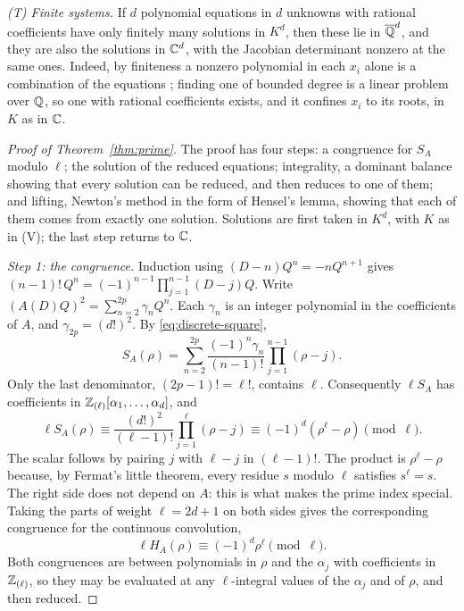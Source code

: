 \emph{\textup{(T)} Finite systems.} If \(d\) polynomial equations in
\(d\) unknowns with rational coefficients have only finitely many
solutions in \(K^d\), then these lie in \(\overline{\mathbb Q}^d\), and they are
also the solutions in \(\mathbb C^d\), with the Jacobian determinant nonzero
at the same ones. Indeed, by finiteness a nonzero polynomial in each
\(x_i\) alone is a combination of the equations
\citep[Chapter~5, \S3]{CoxLittleOSheaIVA}; finding one of bounded degree
is a linear problem over \(\mathbb Q\), so one with rational coefficients
exists, and it confines \(x_i\) to its roots, in \(K\) as in \(\mathbb C\).

\begin{proof}[Proof of Theorem~\ref{thm:prime}]
The proof has four steps: a congruence for \(S_A\) modulo \(\ell\); the
solution of the reduced equations; integrality, a dominant balance
showing that every solution can be reduced, and then reduces to one of
them; and lifting, Newton's method in the form of Hensel's lemma,
showing that each of them comes from exactly one solution. Solutions are
first taken in \(K^d\), with \(K\) as in \textup{(V)}; the last step
returns to \(\mathbb C\).

\emph{Step 1: the congruence.} Induction using \((D-n)Q^n=-nQ^{n+1}\)
gives \((n-1)!\,Q^n=(-1)^{n-1}\prod_{j=1}^{n-1}(D-j)Q\). Write
\((A(D)Q)^2=\sum_{n=2}^{2p}\gamma_nQ^n\). Each \(\gamma_n\) is an
integer polynomial in the coefficients of \(A\), and
\(\gamma_{2p}=(d!)^2\). By \eqref{eq:discrete-square},
\[
 S_A(\rho)=\sum_{n=2}^{2p}\frac{(-1)^n\gamma_n}{(n-1)!}
       \prod_{j=1}^{n-1}(\rho-j).
\]
Only the last denominator, \((2p-1)!=\ell!\), contains \(\ell\).
Consequently \(\ell S_A\) has coefficients in
\(\mathbb Z_{(\ell)}[\alpha_1,\ldots,\alpha_d]\), and
\begin{equation}\label{eq:prime-collapse}
 \ell S_A(\rho)\equiv\frac{(d!)^2}{(\ell-1)!}\prod_{j=1}^{\ell}(\rho-j)
 \equiv(-1)^d(\rho^\ell-\rho)\pmod\ell.
\end{equation}
The scalar follows by pairing \(j\) with \(\ell-j\) in \((\ell-1)!\).
The product is \(\rho^\ell-\rho\) because, by Fermat's little theorem,
every residue \(s\) modulo \(\ell\) satisfies \(s^\ell=s\). The right
side does not depend on \(A\): this is what makes the prime index
special. Taking the parts of weight \(\ell=2d+1\) on both sides gives
the corresponding congruence for the continuous convolution,
\begin{equation}\label{eq:prime-continuous}
 \ell H_A(\rho)\equiv(-1)^d\rho^\ell\pmod\ell .
\end{equation}
Both congruences are between polynomials in \(\rho\) and the
\(\alpha_j\) with coefficients in \(\mathbb Z_{(\ell)}\), so they may be
evaluated at any \(\ell\)-integral values of the \(\alpha_j\) and of
\(\rho\), and then reduced.


\end{proof}
